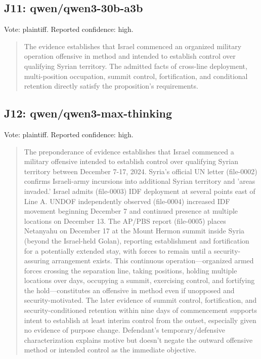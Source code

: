 \subsection{J11: qwen/qwen3-30b-a3b}

Vote: plaintiff.  Reported confidence: high.

\begin{quote}
The evidence establishes that Israel commenced an organized military operation offensive in method and intended to establish control over qualifying Syrian territory. The admitted facts of cross-line deployment, multi-position occupation, summit control, fortification, and conditional retention directly satisfy the proposition's requirements.
\end{quote}

\subsection{J12: qwen/qwen3-max-thinking}

Vote: plaintiff.  Reported confidence: high.

\begin{quote}
The preponderance of evidence establishes that Israel commenced a military offensive intended to establish control over qualifying Syrian territory between December 7-17, 2024. Syria's official UN letter (file-0002) confirms Israeli-army incursions into additional Syrian territory and 'areas invaded.' Israel admits (file-0003) IDF deployment at several points east of Line A. UNDOF independently observed (file-0004) increased IDF movement beginning December 7 and continued presence at multiple locations on December 13. The AP/PBS report (file-0005) places Netanyahu on December 17 at the Mount Hermon summit inside Syria (beyond the Israel-held Golan), reporting establishment and fortification for a potentially extended stay, with forces to remain until a security-assuring arrangement exists. This continuous operation—organized armed forces crossing the separation line, taking positions, holding multiple locations over days, occupying a summit, exercising control, and fortifying the hold—constitutes an offensive in method even if unopposed and security-motivated. The later evidence of summit control, fortification, and security-conditioned retention within nine days of commencement supports intent to establish at least interim control from the outset, especially given no evidence of purpose change. Defendant's temporary/defensive characterization explains motive but doesn't negate the outward offensive method or intended control as the immediate objective.
\end{quote}


